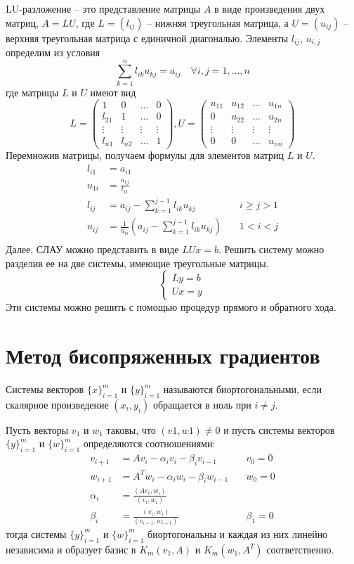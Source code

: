 \documentclass[a4paper, fontsize=14pt]{article}
\begin{document}
LU-разложение -- это представление матрицы $A$ в виде произведения двух матриц, $A=LU$, где
$L=(l_{ij})$ -- нижняя треугольная матрица, а $U=(u_{ij})$ -- верхняя треугольная матрица с
единичной диагональю. Элементы $l_{ij}$, $u_{i,j}$ определим из условия
$$\sum_{k=1}^{n}l_{ik}u_{kj} = a_{ij}\quad\forall i,j = 1,\dots,n$$
где матрицы $L$ и $U$ имеют вид 
$$L = 
\begin{pmatrix} 
    1 & 0 & \dots & 0 \\
    l_{21} & 1 & \dots & 0 \\
    \vdots & \vdots & \vdots &\vdots \\
    l_{n1} & l_{n2} & \dots & 1
\end{pmatrix}, 
U = 
\begin{pmatrix} 
    u_{11} & u_{12} & \dots & u_{1n} \\
    0 & u_{22} & \dots & u_{2n} \\
    \vdots & \vdots & \vdots &\vdots \\
    0 & 0 & \dots & u_{nn}
\end{pmatrix}
$$
Перемножив матрицы, получаем формулы для элементов матриц $L$ и $U$.
\begin{align*}
    l_{i1} &= a_{i1} \\
    u_{1i} &= \frac{a_{1j}}{l_{11}} \\
    l_{ij} &= a_{ij} - \sum_{k=1}^{j-1} l_{ik}u_{kj} \quad &i \ge j > 1\\
    u_{ij} &= \frac{1}{u_{ii}} \left(a_{ij} - \sum_{k=1}^{j-1} l_{ik}u_{kj}\right) \quad &1 < i < j\\
\end{align*}
Далее, СЛАУ можно представить в виде $LUx=b$. Решить систему можно разделив ее на две системы,
имеющие треугольные матрицы. 
$$
\begin{cases}
    Ly=b\\
    Ux=y
\end{cases}
$$
    Эти системы можно решить с помощью процедур прямого и обратного хода.
\section{Метод бисопряженных градиентов}
    Системы векторов $\{x\}^m_{i=1}$ и $\{y\}^m_{i=1}$ называются
биортогональными, если скалярное произведение $(x_i , y_i)$ обращается в ноль при $i\neq j$.

    Пусть векторы $v_1$ и $w_1$ таковы, что $(v1 , w1) \neq 0$ и пусть системы векторов $\{y\}^m_{i=1}$
и $\{w\}^m_{i=1}$ определяются соотношениями:
\begin{align*}
    v_{i+1} &= A v_i - \alpha_i v_i - \beta_i v_{i-1} \quad &v_0 = 0\\
    w_{i+1} &= A^T w_i - \alpha_i w_i - \beta_i w_{i-1} \quad &w_0 = 0\\
    \alpha_i &= \frac{(Av_i,w_i)}{(v_i,w_i)} \\ 
    \beta_i &= \frac{(v_i,w_i)}{(v_{i-1},w_{i-1})} \quad &\beta_1 = 0
\end{align*}
тогда системы $\{y\}^m_{i=1}$ и $\{w\}^m_{i=1}$ биортогональны и каждая из них линейно независима и
образует базис в $K_m(v_1,A)$ и $K_m(w_1,A^T)$ соответственно.
\end{document}
